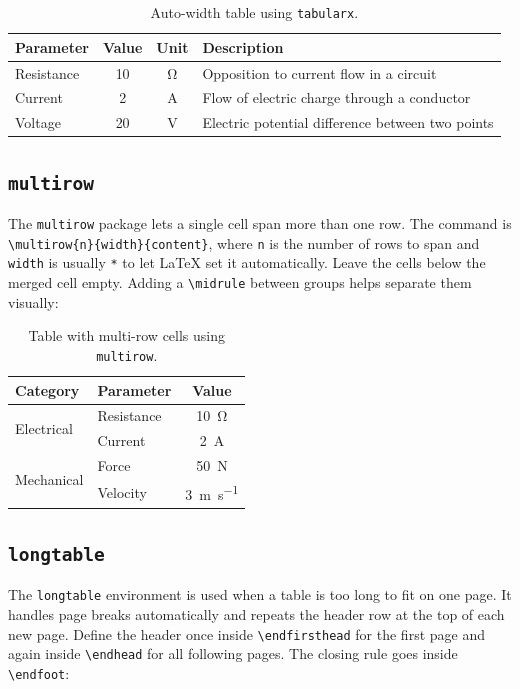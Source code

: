 \begin{table}[H]
	\centering
	\caption{Auto-width table using \texttt{tabularx}.}
	\label{tab:tabularx}
	\begin{tabularx}{\linewidth}{@{}lccX@{}}
		\toprule
		Parameter & Value & Unit & Description \\
		\midrule
		Resistance & 10 & \si{\ohm} & Opposition to current flow in a circuit \\
		Current    & 2  & \si{\ampere} & Flow of electric charge through a conductor \\
		Voltage    & 20 & \si{\volt} & Electric potential difference between two points \\
		\bottomrule
	\end{tabularx}
\end{table}

\subsection{\texttt{multirow}}
The \texttt{multirow} package lets a single cell span more than one row. The command is \texttt{\textbackslash multirow\{n\}\{width\}\{content\}}, where \texttt{n} is the number of rows to span and \texttt{width} is usually \texttt{*} to let \LaTeX{} set it automatically. Leave the cells below the merged cell empty. Adding a \texttt{\textbackslash midrule} between groups helps separate them visually:

\begin{table}[H]
	\centering
	\caption{Table with multi-row cells using \texttt{multirow}.}
	\label{tab:multirow}
	\begin{tabular}{@{}llc@{}}
		\toprule
		Category & Parameter & Value \\
		\midrule
		\multirow{2}{*}{Electrical} & Resistance & \SI{10}{\ohm} \\
		& Current    & \SI{2}{\ampere} \\
		\midrule
		\multirow{2}{*}{Mechanical} & Force    & \SI{50}{\newton} \\
		& Velocity & \SI{3}{\metre\per\second} \\
		\bottomrule
	\end{tabular}
\end{table}

\subsection{\texttt{longtable}}
The \texttt{longtable} environment is used when a table is too long to fit on one page. It handles page breaks automatically and repeats the header row at the top of each new page. Define the header once inside \texttt{\textbackslash endfirsthead} for the first page and again inside \texttt{\textbackslash endhead} for all following pages. The closing rule goes inside \texttt{\textbackslash endfoot}:

